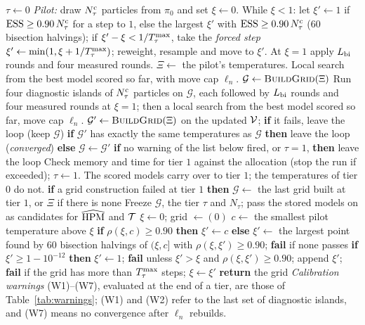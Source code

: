 \begin{algorithm}[tp]
\caption{Calibration of the temperature grid. Tier $\tau=0$ first; tier $\tau=1$ at most once, after a warning.
$\Nc_\tau$, $\Tmax_\tau$, $\ell_n$ and $\Lbi$ are those of Table~\ref{tab:defaults}.}\label{alg:calibration}
\small
\begin{algorithmic}[1]
\State $\tau\gets0$
\Loop
  \State \emph{Pilot:} draw $\Nc_\tau$ particles from $\pi_0$ and set $\xi\gets0$. While $\xi<1$: let $\xi'\gets1$ if
    $\mathrm{ESS}\ge0.90\,N^{\mathrm c}_\tau$ for a step to $1$, else the largest $\xi'$ with $\mathrm{ESS}\ge0.90\,N^{\mathrm c}_\tau$ (60 bisection halvings);
    if $\xi'-\xi<1/T^{\max}_\tau$, take the \emph{forced step} $\xi'\gets\min(1,\xi+1/T^{\max}_\tau)$; reweight, resample and move
    to $\xi'$. At $\xi=1$ apply $\Lbi$ rounds and four measured rounds. $\Xi\gets$ the pilot's temperatures.
  \State Local search from the best model scored so far, with move cap $\ell_n$.
  \State $\mathcal G\gets\textsc{BuildGrid}(\Xi)$
    \State Run four diagnostic islands of $\Nc_\tau$ particles on $\mathcal G$, each followed by $\Lbi$ rounds and four
      measured rounds at $\xi=1$; then a local search from the best model scored so far, move cap $\ell_n$.
    \State $\mathcal G'\gets\textsc{BuildGrid}(\Xi)$ on the updated $\mathcal V$; \textbf{if} it fails, leave the loop
      (keep $\mathcal G$)
    \State \textbf{if} $\mathcal G'$ has exactly the same temperatures as $\mathcal G$ \textbf{then} leave the loop
      (\emph{converged}) \textbf{else} $\mathcal G\gets\mathcal G'$
  \EndFor
  \State \textbf{if} no warning of the list below fired, or $\tau=1$, \textbf{then} leave the loop
  \State Check memory and time for tier $1$ against the allocation (stop the run if exceeded); $\tau\gets1$. The scored
    models carry over to tier $1$; the temperatures of tier $0$ do not.
\EndLoop
\State \textbf{if} a grid construction failed at tier $1$ \textbf{then} $\mathcal G\gets$ the last grid built at
  tier $1$, or $\Xi$ if there is none
\State Freeze $\mathcal G$, the tier $\tau$ and $N_\tau$; pass the stored models on as candidates for $\widehat{\mathrm{HPM}}$ and $\mathcal T$
\Statex
{}
  \State $\xi\gets0$; grid $\gets(0)$
    \State $c\gets$ the smallest pilot temperature above $\xi$
    \State \textbf{if} $\rho(\xi,c)\ge0.90$ \textbf{then} $\xi'\gets c$ \textbf{else} $\xi'\gets$ the largest point found by
      60 bisection halvings of $(\xi,c]$ with $\rho(\xi,\xi')\ge0.90$; \textbf{fail} if none passes
    \State \textbf{if} $\xi'\ge1-10^{-12}$ \textbf{then} $\xi'\gets1$; \textbf{fail} unless $\xi'>\xi$ and
      $\rho(\xi,\xi')\ge0.90$; append $\xi'$; \textbf{fail} if the grid has more than $\Tmax_\tau$ steps; $\xi\gets\xi'$
  \EndWhile
  \State \textbf{return} the grid
\EndProcedure
\Statex
\Statex \emph{Calibration warnings} (W1)--(W7), evaluated at the end of a tier, are those of Table~\ref{tab:warnings};
  (W1) and (W2) refer to the last set of diagnostic islands, and (W7) means no convergence after $\ell_n$ rebuilds.
\end{algorithmic}
\end{algorithm}

